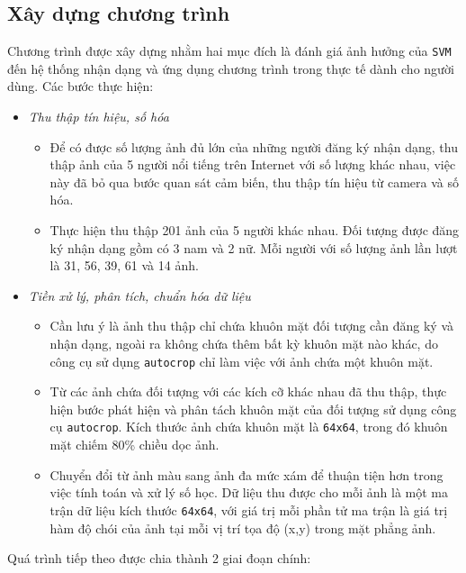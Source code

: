 \documentclass[12pt,a4paper]{article}
\begin{document}
\subsection{Xây dựng chương trình}
Chương trình được xây dựng nhằm hai mục đích là đánh giá ảnh hưởng của \texttt{SVM} đến hệ thống nhận dạng và ứng dụng chương trình trong thực tế dành cho người dùng. Các bước thực hiện:  
\begin{itemize}
\item \textit{Thu thập tín hiệu, số hóa}
\begin{itemize}
\item Để có được số lượng ảnh đủ lớn của những người đăng ký nhận dạng, thu thập ảnh của 5 người nổi tiếng trên Internet với số lượng khác nhau, việc này đã bỏ qua bước quan sát cảm biến, thu thập tín hiệu từ camera và số hóa.  
\item Thực hiện thu thập 201 ảnh của 5 người khác nhau. Đối tượng được đăng ký nhận dạng gồm có 3 nam và 2 nữ. Mỗi người với số lượng ảnh lần lượt là 31, 56, 39, 61 và 14 ảnh. 
\end{itemize}
\item \textit{Tiền xử lý, phân tích, chuẩn hóa dữ liệu}
\begin{itemize}
\item Cần lưu ý là ảnh thu thập chỉ chứa khuôn mặt đối tượng cần đăng ký và nhận dạng, ngoài ra không chứa thêm bất kỳ khuôn mặt nào khác, do công cụ sử dụng \texttt{autocrop} chỉ làm việc với ảnh chứa một khuôn mặt. 
\item Từ các ảnh chứa đối tượng với các kích cỡ khác nhau đã thu thập, thực hiện bước phát hiện và phân tách khuôn mặt của đối tượng sử dụng công cụ \texttt{autocrop}. Kích thước ảnh chứa khuôn mặt là \texttt{64x64}, trong đó khuôn mặt chiếm 80\% chiều dọc ảnh.
\item Chuyển đổi từ ảnh màu sang ảnh đa mức xám để thuận tiện hơn trong việc tính toán và xử lý số học. Dữ liệu thu được cho mỗi ảnh là một ma trận dữ liệu kích thước \texttt{64x64}, với giá trị mỗi phần tử ma trận là giá trị hàm độ chói của ảnh tại mỗi vị trí tọa độ (x,y) trong mặt phẳng ảnh.  
\end{itemize}
\end{itemize}
Quá trình tiếp theo được chia thành 2 giai đoạn chính:
\end{document}
